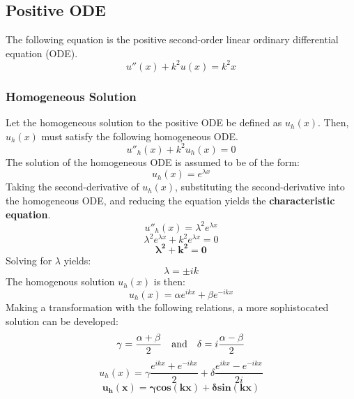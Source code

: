 \documentclass[10pt, reqno]{article}		%
\numberwithin{equation}{section}
\begin{document}
\subsection{Positive ODE}

The following equation is the positive second-order linear ordinary differential equation (ODE).
\begin{equation}
u''(x)+k^2u(x)=k^2x
\end{equation}

\subsubsection{Homogeneous Solution}

Let the homogeneous solution to the positive ODE be defined as $u_h(x)$. Then, $u_h(x)$ must satisfy the following homogeneous ODE.
\begin{equation}
u''_h(x) + k^2u_h(x) = 0
\end{equation}
The solution of the homogeneous ODE is assumed to be of the form: 
\begin{equation}
u_h(x) = e^{\lambda x}
\end{equation}
Taking the second-derivative of $u_h(x)$, substituting the second-derivative into the homogeneous ODE, and reducing the equation yields the \textbf{characteristic equation}.
\begin{equation}
u''_h(x) = \lambda^2 e^{\lambda x}
\end{equation}
\begin{equation}
\lambda^2 e^{\lambda x} + k^2e^{\lambda x} = 0
\end{equation}
\begin{equation}
\mathbf{\lambda^2 + k^2 = 0}
\end{equation}
Solving for $\lambda$ yields:
\begin{equation}
\lambda = \pm ik
\end{equation}
The homogenous solution $u_h(x)$ is then:
\begin{equation}
u_h(x) = \alpha e^{ikx} + \beta e^{-ikx}
\end{equation}
Making a transformation with the following relations, a more sophistocated solution can be developed:
\begin{equation}
\gamma = \frac{\alpha+\beta}{2} \quad \textnormal{and} \quad \delta = i\frac{\alpha-\beta}{2}
\end{equation}
\begin{equation}
u_h(x) = \gamma \frac{e^{ikx}+e^{-ikx}}{2} + \delta \frac{e^{ikx}-e^{-ikx}}{2i}
\end{equation}
\begin{equation}
\mathbf{u_h(x) = \gamma cos(kx) + \delta sin(kx)}
\end{equation}
\end{document}

